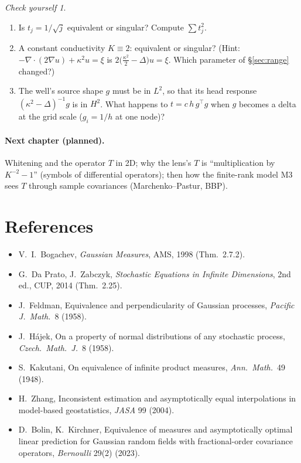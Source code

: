 \documentclass[11pt]{article}
\theoremstyle{definition}
\theoremstyle{remark}
\newtheorem*{exercise}{Check yourself}
\begin{document}
\begin{exercise}
\begin{enumerate}
\item Is $t_j=1/\sqrt j$ equivalent or singular? Compute $\sum t_j^2$.
\item A constant conductivity $K\equiv2$: equivalent or singular? (Hint: $-\nabla\cdot(2\nabla u)+\kappa^2u=\xi$ is
$2\big(\tfrac{\kappa^2}{2}-\Delta\big)u=\xi$. Which parameter of \S\ref{sec:range} changed?)
\item The well's source shape $g$ must be in $L^2$, so that its head response $(\kappa^2-\Delta)^{-1}g$ is in $H^2$. What happens to $t=c\,h\,g^\top g$ when $g$ becomes a delta at the grid scale ($g_i=1/h$ at one node)?
\end{enumerate}
\end{exercise}

\paragraph{Next chapter (planned).} Whitening and the operator $T$ in 2D; why the lens's $T$ is ``multiplication by
$K^{-2}-1$'' (symbols of differential operators); then how the finite-rank model M3 sees $T$ through
sample covariances (Marchenko--Pastur, BBP).

\section*{References}
\begin{itemize}\small
\item V.~I.~Bogachev, \emph{Gaussian Measures}, AMS, 1998 (Thm.~2.7.2).
\item G.~Da Prato, J.~Zabczyk, \emph{Stochastic Equations in Infinite Dimensions}, 2nd ed., CUP, 2014 (Thm.~2.25).
\item J.~Feldman, Equivalence and perpendicularity of Gaussian processes, \emph{Pacific J.\ Math.}\ 8 (1958).
\item J.~H\'ajek, On a property of normal distributions of any stochastic process, \emph{Czech.\ Math.\ J.}\ 8 (1958).
\item S.~Kakutani, On equivalence of infinite product measures, \emph{Ann.\ Math.}\ 49 (1948).
\item H.~Zhang, Inconsistent estimation and asymptotically equal interpolations in model-based geostatistics, \emph{JASA} 99 (2004).
\item D.~Bolin, K.~Kirchner, Equivalence of measures and asymptotically optimal linear prediction for Gaussian random fields with fractional-order covariance operators, \emph{Bernoulli} 29(2) (2023).
\end{itemize}
\end{document}
